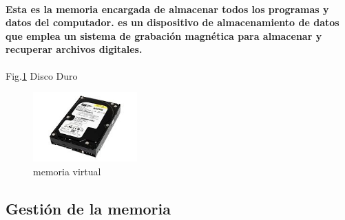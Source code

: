 \documentclass{article}
\begin{document}
\paragraph{Esta es la memoria encargada de almacenar todos los programas y datos del computador. es un dispositivo de almacenamiento de datos que emplea un sistema de grabación magnética para almacenar y recuperar archivos digitales.\cite{disco}}

Fig.\ref{fig:disco duro} Disco Duro
    \begin{figure}[h]
    \includegraphics[width=4cm]{disco duro.jpg}
    \centering
    \caption{memoria virtual}
    \label{fig:disco duro}
    \end{figure}
\subsection{Gestión de la memoria}
\end{document}
